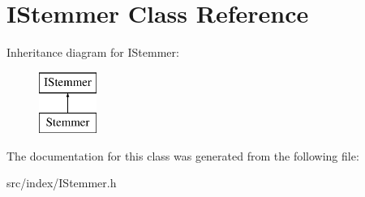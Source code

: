 \hypertarget{classIStemmer}{}\section{I\+Stemmer Class Reference}
\label{classIStemmer}
Inheritance diagram for I\+Stemmer\+:\begin{figure}[H]
\begin{center}
\leavevmode
\includegraphics[height=2.000000cm]{classIStemmer}
\end{center}
\end{figure}


The documentation for this class was generated from the following file\+:\begin{DoxyCompactItemize}
\item 
src/index/I\+Stemmer.\+h\end{DoxyCompactItemize}
